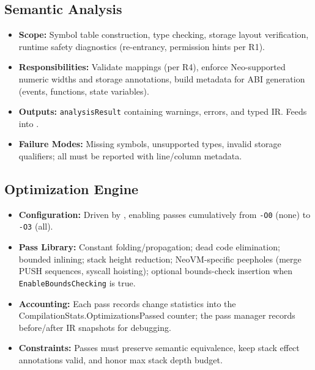 \documentclass[11pt]{article}
\begin{document}
\subsection{Semantic Analysis}
\begin{itemize}
    \item \textbf{Scope:} Symbol table construction, type checking, storage layout verification, runtime safety diagnostics (re-entrancy, permission hints per R1).
    \item \textbf{Responsibilities:} Validate mappings (per R4), enforce Neo-supported numeric widths and storage annotations, build metadata for ABI generation (events, functions, state variables).
    \item \textbf{Outputs:} \texttt{analysisResult} containing warnings, errors, and typed IR. Feeds into .
    \item \textbf{Failure Modes:} Missing symbols, unsupported types, invalid storage qualifiers; all must be reported with line/column metadata.
\end{itemize}

\subsection{Optimization Engine}
\begin{itemize}
    \item \textbf{Configuration:} Driven by , enabling passes cumulatively from \texttt{-O0} (none) to \texttt{-O3} (all).
    \item \textbf{Pass Library:} Constant folding/propagation; dead code elimination; bounded inlining; stack height reduction; NeoVM-specific peepholes (merge PUSH sequences, syscall hoisting); optional bounds-check insertion when \texttt{EnableBoundsChecking} is true.
    \item \textbf{Accounting:} Each pass records change statistics into the\\
    CompilationStats.\allowbreak OptimizationsPassed counter; the pass manager records before/after IR snapshots for debugging.
    \item \textbf{Constraints:} Passes must preserve semantic equivalence, keep stack effect annotations valid, and honor max stack depth budget.
\end{itemize}
\end{document}
